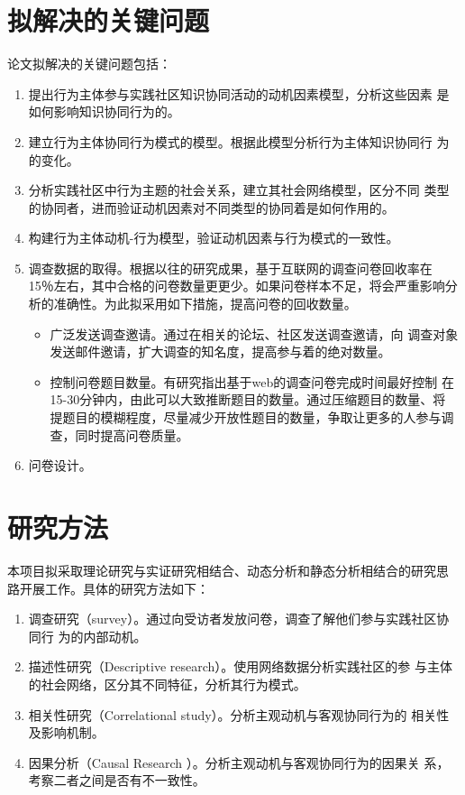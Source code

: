 \documentclass[12pt,a4paper]{ctexart}
\begin{document}
\section{拟解决的关键问题 }
\label{sec:-}
论文拟解决的关键问题包括：
\begin{enumerate}
\item 提出行为主体参与实践社区知识协同活动的动机因素模型，分析这些因素
  是如何影响知识协同行为的。
\item 建立行为主体协同行为模式的模型。根据此模型分析行为主体知识协同行
  为的变化。
\item  分析实践社区中行为主题的社会关系，建立其社会网络模型，区分不同
  类型的协同者，进而验证动机因素对不同类型的协同着是如何作用的。
\item  构建行为主体动机-行为模型，验证动机因素与行为模式的一致性。


\item 调查数据的取得。根据以往的研究成果，基于互联网的调查问卷回收率在
  15％左右，其中合格的问卷数量更更少。如果问卷样本不足，将会严重影响分
  析的准确性。为此拟采用如下措施，提高问卷的回收数量。
  \begin{itemize}
  \item 广泛发送调查邀请。通过在相关的论坛、社区发送调查邀请，向
    调查对象发送邮件邀请，扩大调查的知名度，提高参与着的绝对数量。
   \item 控制问卷题目数量。有研究指出基于web的调查问卷完成时间最好控制
     在15-30分钟内，由此可以大致推断题目的数量。通过压缩题目的数量、将
     提题目的模糊程度，尽量减少开放性题目的数量，争取让更多的人参与调
     查，同时提高问卷质量。
  \end{itemize}
\item  问卷设计。
\end{enumerate}

\section{研究方法}
本项目拟采取理论研究与实证研究相结合、动态分析和静态分析相结合的研究思
路开展工作。具体的研究方法如下：
\begin{enumerate}
\item  调查研究（survey）。通过向受访者发放问卷，调查了解他们参与实践社区协同行
  为的内部动机。
\item 描述性研究（Descriptive research）。使用网络数据分析实践社区的参
  与主体的社会网络，区分其不同特征，分析其行为模式。
\item 相关性研究（Correlational study）。分析主观动机与客观协同行为的
  相关性及影响机制。
\item 因果分析（Causal Research ）。分析主观动机与客观协同行为的因果关
  系，考察二者之间是否有不一致性。
\end{enumerate}
\end{document}
